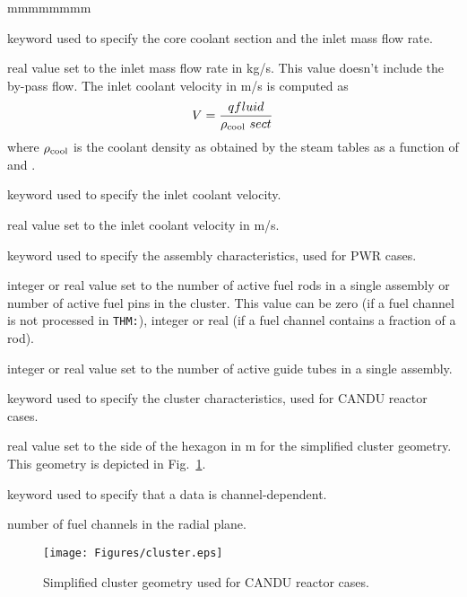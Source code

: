 \begin{ListeDeDescription}{mmmmmmmm}
\item[\moc{INLET-Q}] keyword used to specify the core coolant section and the inlet mass flow rate.

\item[\dusa{qfluid}] real value set to the inlet mass flow rate in kg/s. This value doesn't include the by-pass flow.
The inlet coolant velocity in m/s is computed as $$V={{\sl qfluid} \over \rho_{\rm cool} \ {\sl sect}}$$
\noindent where $\rho_{\rm cool}$ is the coolant density as obtained by the steam tables as a function of  and .

\item[\moc{SPEED}] keyword used to specify the inlet coolant velocity.

\item[\dusa{velocity}] real value set to the inlet coolant velocity in m/s.

\item[\moc{ASSMB}] keyword used to specify the assembly characteristics, used for PWR cases.

\item[\dusa{nbf}] integer or real value set to the number of active fuel rods in a single assembly or number of active fuel pins in the cluster. This value
can be zero (if a fuel channel is not processed in {\tt THM:}), integer or real (if a fuel channel contains a fraction of a rod).

\item[\dusa{nbg}] integer or real value set to the number of active guide tubes in a single assembly.

\item[\moc{CLUSTER}] keyword used to specify the cluster characteristics, used for CANDU reactor cases.

\item[\dusa{pitch}] real value set to the side of the hexagon in m for the simplified cluster geometry. This geometry is depicted in Fig.~\ref{fig:Cluster}.

\item[\moc{CHAN}] keyword used to specify that a data is channel-dependent.

\item[\dusa{nch}] number of fuel channels in the radial plane.

\begin{figure}[h!]
  \begin{center}
    \texttt{[image: Figures/cluster.eps]} 
\caption{Simplified cluster geometry used for CANDU reactor cases.}\label{fig:Cluster}
  \end{center}
\end{figure}


\end{ListeDeDescription}
